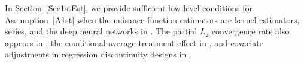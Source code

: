 \documentclass[lettersize, 12pt]{article}
\begin{document}
In Section~\ref{Sec1stEst}, we provide sufficient low-level conditions for Assumption~\ref{A1st} 
when the nuisance function estimators are kernel estimators, series, and the deep neural networks in \cite{Farrell18}. 
The partial $L_2$ convergence rate also appears in \cite{Kennedy}, the conditional average treatment effect in \cite{Fan}, and 
covariate adjustments in regression discontinuity designs in \cite{RotheRD}. 




\end{document}
